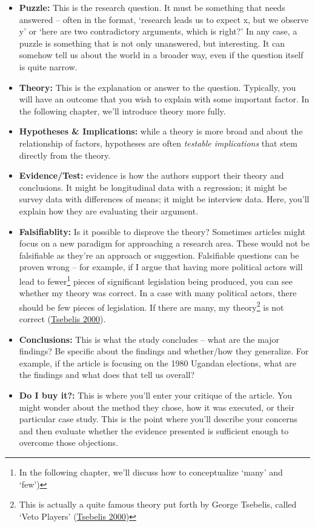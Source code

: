 \documentclass{book}
\begin{document}
\begin{itemize}
\item
  \textbf{Puzzle:} This is the research question. It must be something that
  needs answered -- often in the format, `research leads us to expect x, but
  we observe y' or `here are two contradictory arguments, which is right?' In
  any case, a puzzle is something that is not only unanswered, but
  interesting. It can somehow tell us about the world in a broader way, even
  if the question itself is quite narrow.
\item
  \textbf{Theory:} This is the explanation or answer to the question.
  Typically, you will have an outcome that you wish to explain with some
  important factor. In the following chapter, we'll introduce theory more
  fully.
\item
  \textbf{Hypotheses \& Implications:} while a theory is more broad and about
  the relationship of factors, hypotheses are often \emph{testable
  implications} that stem directly from the theory.
\item
  \textbf{Evidence/Test:} evidence is how the authors support their theory and
  conclusions. It might be longitudinal data with a regression; it might be
  survey data with differences of means; it might be interview data. Here,
  you'll explain how they are evaluating their argument.
\item
  \textbf{Falsifiablity:} Is it possible to disprove the theory? Sometimes
  articles might focus on a new paradigm for approaching a research area.
  These would not be falsifiable as they're an approach or suggestion.
  Falsifiable questions can be proven wrong -- for example, if I argue that
  having more political actors will lead to fewer\footnote{In the following
    chapter, we'll discuss how to conceptualize `many' and `few')} pieces of
  significant legislation being produced, you can see whether my theory was
  correct. In a case with many political actors, there should be few pieces of
  legislation. If there are many, my theory\footnote{This is actually a quite
    famous theory put forth by George Tsebelis, called `Veto Players'
    (\protect\hyperlink{ref-tsebelisVetoPlayersInstitutional2000}{Tsebelis
    2000})} is not correct
  (\protect\hyperlink{ref-tsebelisVetoPlayersInstitutional2000}{Tsebelis
  2000}).
\item
  \textbf{Conclusions:} This is what the study concludes -- what are the major
  findings? Be specific about the findings and whether/how they generalize.
  For example, if the article is focusing on the 1980 Ugandan elections, what
  are the findings and what does that tell us overall?
\item
  \textbf{Do I buy it?:} This is where you'll enter your critique of the
  article. You might wonder about the method they chose, how it was executed,
  or their particular case study. This is the point where you'll describe your
  concerns and then evaluate whether the evidence presented is sufficient
  enough to overcome those objections.
\end{itemize}
\end{document}
